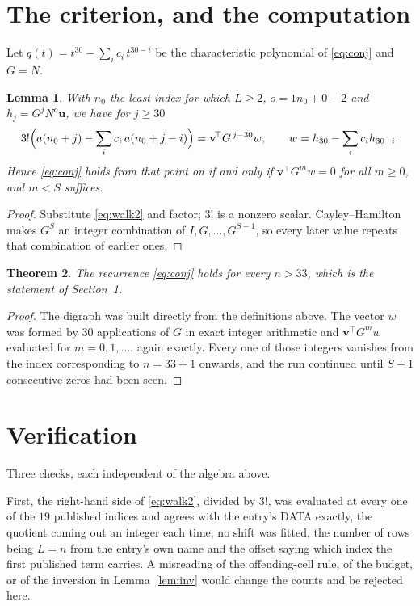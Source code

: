 \documentclass[11pt,a4paper]{article}
\theoremstyle{plain}
\newtheorem{theorem}{Theorem}
\newtheorem{lemma}[theorem]{Lemma}
\theoremstyle{definition}
\begin{document}
\section{The criterion, and the computation}

Let $q(t)=t^{30}-\sum_i c_i\,t^{30-i}$ be the characteristic polynomial of
\eqref{eq:conj} and $G=N$.

\begin{lemma}\label{lem:crit}
With $n_0$ the least index for which $L\ge2$, $o=1n_0+0-2$ and
$h_j=G^{j}N^{o}\mathbf{u}$, we have for $j\ge30$
\[
3!\Bigl(a(n_0+j)-\sum_i c_i\,a(n_0+j-i)\Bigr)=\mathbf{v}^{\!\top}G^{\,j-30}w,
\qquad w=h_{30}-\sum_i c_i h_{30-i} .
\]
Hence \eqref{eq:conj} holds from that point on if and only if
$\mathbf{v}^{\!\top}G^{m}w=0$ for all $m\ge0$, and $m<S$ suffices.
\end{lemma}

\begin{proof}
Substitute \eqref{eq:walk2} and factor; $3!$ is a nonzero scalar. Cayley--Hamilton
makes $G^{S}$ an integer combination of $I,G,\dots,G^{S-1}$, so every later value repeats
that combination of earlier ones.
\end{proof}

\begin{theorem}
The recurrence \eqref{eq:conj} holds for every $n>33$, which is the statement of
Section~1.
\end{theorem}

\begin{proof}
The digraph was built directly from the definitions above. The vector $w$ was formed by
$30$ applications of $G$ in exact integer arithmetic and $\mathbf{v}^{\!\top}G^{m}w$
evaluated for $m=0,1,\dots$, again exactly. Every one of those integers vanishes from the
index corresponding to $n=33+1$ onwards, and the run continued until $S+1$ consecutive
zeros had been seen.
\end{proof}

\section{Verification}

Three checks, each independent of the algebra above.

First, the right-hand side of \eqref{eq:walk2}, divided by $3!$, was evaluated at every
one of the $19$ published indices and agrees with the entry's DATA exactly, the quotient
coming out an integer each time; no shift was fitted, the number of rows being
$L=n$ from the entry's own name and the offset saying which index the first published
term carries. A misreading of the offending-cell rule, of the budget, or of the inversion in
Lemma~\ref{lem:inv} would change the counts and be rejected here.
\end{document}
